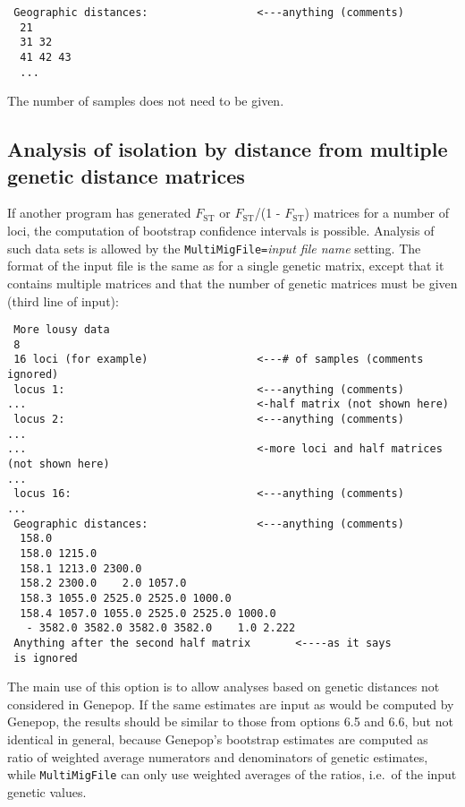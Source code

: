 \documentclass[12pt,]{book}
\theoremstyle{definition}
\theoremstyle{definition}
\theoremstyle{definition}
\theoremstyle{remark}
\begin{document}
\begin{verbatim}
 Geographic distances:                 <---anything (comments)
  21
  31 32
  41 42 43
  ...
\end{verbatim}

The number of samples does not need to be given.

\subsection{Analysis of isolation by distance from multiple genetic
distance
matrices}\label{analysis-of-isolation-by-distance-from-multiple-genetic-distance-matrices}

If another program has generated \(F_{\mathrm{ST}}\) or
\(F_{\mathrm{ST}}\)/(1 - \(F_{\mathrm{ST}}\)) matrices for a number of
loci, the computation of bootstrap confidence intervals is possible.
Analysis of such data sets is allowed by the
\texttt{MultiMigFile=}\emph{input file name}
setting. The format of the input file is the
same as for a single genetic matrix, except that it contains multiple
matrices and that the number of genetic matrices must be given (third
line of input):

\begin{verbatim}
 More lousy data
 8
 16 loci (for example)                 <---# of samples (comments ignored)
 locus 1:                              <---anything (comments)
...                                    <-half matrix (not shown here)
 locus 2:                              <---anything (comments)
...
...                                    <-more loci and half matrices (not shown here)
...
 locus 16:                             <---anything (comments)
...
 Geographic distances:                 <---anything (comments)
  158.0
  158.0 1215.0
  158.1 1213.0 2300.0
  158.2 2300.0    2.0 1057.0
  158.3 1055.0 2525.0 2525.0 1000.0
  158.4 1057.0 1055.0 2525.0 2525.0 1000.0
   - 3582.0 3582.0 3582.0 3582.0    1.0 2.222
 Anything after the second half matrix       <----as it says
 is ignored
\end{verbatim}

The main use of this option is to allow analyses based on genetic
distances not considered in Genepop. If the same estimates are input as
would be computed by Genepop, the results should be similar to those
from options 6.5 and 6.6, but not identical in general, because
Genepop's bootstrap estimates are computed as ratio of weighted average
numerators and denominators of genetic estimates, while
\texttt{MultiMigFile} can only use weighted averages of the ratios,
i.e.~of the input genetic values.
\end{document}

